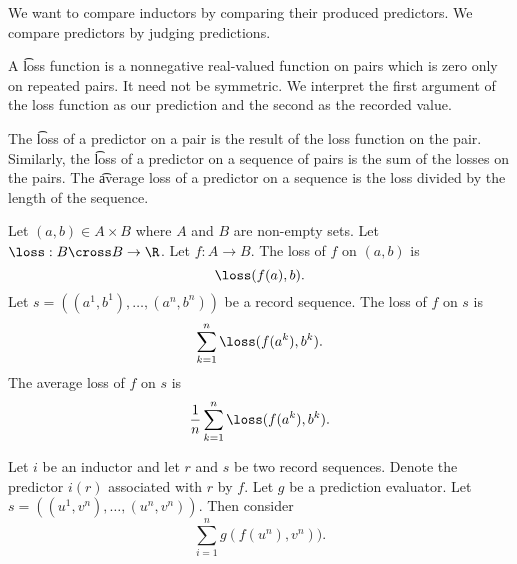
\sbasic

























\sstart
{}


We want to compare inductors
by comparing their produced predictors.
We compare predictors by judging predictions.


A \t{loss} function is a nonnegative real-valued function on pairs which is zero only on repeated pairs.
It need not be symmetric.
We interpret the first argument of the
loss function as our prediction
and the second as the recorded value.

The \t{loss of a predictor on a pair} is the
result of the loss function on the pair.
Similarly, the \t{loss of a predictor on  a sequence} of pairs is the sum of the losses on the pairs.
The \t{average loss of a predictor on a sequence} is the loss divided by the length of the sequence.


Let $(a, b) \in A \times B$
where $A$ and $B$ are non-empty sets.
Let $\loss: B \cross B \to \R$.
Let $f: A \to B$.
The loss of $f$ on $(a, b)$ is
\[
  \loss(f(a),b).
\]
Let $s = ((a^1, b^1), \dots, (a^n, b^n))$
be a record sequence.
The loss of $f$ on $s$ is
\[
  \sum_{k = 1}^{n} \loss(f(a^k), b^k).
\]
The average loss of $f$ on $s$ is
\[
  \frac{1}{n} \sum_{k = 1}^{n} \loss(f(a^k), b^k).
\]




Let $i$ be an inductor and let
$r$ and $s$ be two record sequences.
Denote the predictor $i(r)$ associated
with $r$ by $f$.
Let $g$ be a prediction evaluator.
Let $s = ((u^1, v^n), \dots, (u^n, v^n))$.
Then consider
\[
  \sum_{i = 1}^{n} g(f(u^n), v^n)).
\]


